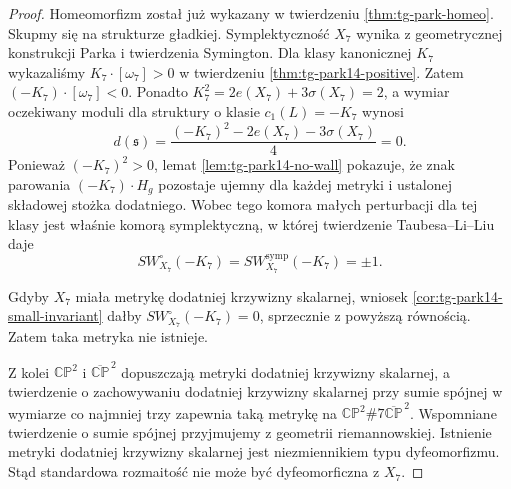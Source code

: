 \begin{proof}
Homeomorfizm został już wykazany w twierdzeniu
\ref{thm:tg-park-homeo}. Skupmy się na strukturze gładkiej.
Symplektyczność $X_7$ wynika z geometrycznej konstrukcji
Parka i twierdzenia Symington. Dla klasy kanonicznej $K_7$
wykazaliśmy $K_7\cdot[\omega_7]>0$ w twierdzeniu
\ref{thm:tg-park14-positive}. Zatem
$(-K_7)\cdot[\omega_7]<0$.
Ponadto $K_7^2=2e(X_7)+3\sigma(X_7)=2$,
a wymiar oczekiwany moduli dla struktury o klasie
$c_1(L)=-K_7$ wynosi
\[
d(\mathfrak s)=\frac{(-K_7)^2-2e(X_7)-3\sigma(X_7)}4=0.
\]
Ponieważ $(-K_7)^2>0$, lemat
\ref{lem:tg-park14-no-wall} pokazuje, że znak
parowania $(-K_7)\cdot H_g$ pozostaje ujemny dla
każdej metryki i ustalonej składowej stożka dodatniego.
Wobec tego komora małych perturbacji dla tej klasy
jest właśnie komorą symplektyczną, w której twierdzenie
Taubesa--Li--Liu daje
\[
SW_{X_7}^{\circ}(-K_7)
 =SW_{X_7}^{\mathrm{symp}}(-K_7)=\pm1.
\]

Gdyby $X_7$ miała metrykę dodatniej krzywizny skalarnej,
wniosek \ref{cor:tg-park14-small-invariant} dałby
$SW_{X_7}^{\circ}(-K_7)=0$, sprzecznie z powyższą równością.
Zatem taka metryka nie istnieje.

Z kolei $\mathbb{CP}^{2}$ i $\overline{\mathbb{CP}}^{\,2}$
dopuszczają metryki dodatniej krzywizny skalarnej,
a twierdzenie o zachowywaniu dodatniej krzywizny
skalarnej przy sumie spójnej w wymiarze co najmniej trzy
zapewnia taką metrykę na
$\mathbb{CP}^{2}\#7\overline{\mathbb{CP}}^{\,2}$.
Wspomniane twierdzenie o sumie spójnej przyjmujemy z
geometrii riemannowskiej. Istnienie metryki dodatniej
krzywizny skalarnej jest niezmiennikiem typu dyfeomorfizmu.
Stąd standardowa rozmaitość nie może być dyfeomorficzna
z $X_7$.
\end{proof}

\begin{center}
\end{center}

